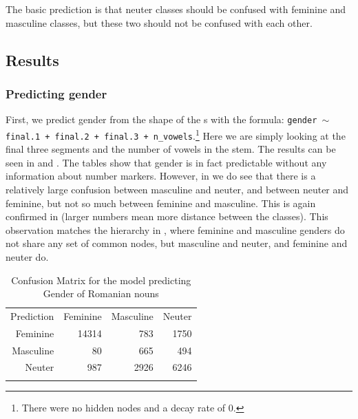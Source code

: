 The basic prediction is that neuter classes should be confused with feminine and masculine classes, but these two should not be confused with each other.

\subsection{Results}

\subsubsection{Predicting gender}

First, we predict gender from the shape of the s with the formula: \texttt{gender $\sim$ final.1 + final.2 + final.3 + n\_vowels}.\footnote{There were no hidden nodes and a decay rate of 0.} Here we are simply looking at the final three segments and the number of vowels in the stem. The results can be seen in  and . The tables show that gender is in fact predictable without any information about number markers. However, in  we do see that there is a relatively large confusion between masculine and neuter, and between neuter and feminine, but not so much between feminine and masculine. This is again confirmed in  (larger numbers mean more distance between the classes). This observation matches the hierarchy in , where feminine and masculine genders do not share any set of common nodes, but masculine and neuter, and feminine and neuter do.

\begin{table}
  \centering
  \begin{tabular}{rrrr}
    \lsptoprule
    \multicolumn{4}{c}{Reference}              \\
    \midrule
    Prediction & Feminine & Masculine & Neuter \\
    Feminine   & 14314    & 783       & 1750   \\
    Masculine  & 80       & 665       & 494    \\
    Neuter     & 987      & 2926      & 6246   \\
    \lspbottomrule
  \end{tabular}
  \caption{Confusion Matrix for the model predicting Gender of Romanian nouns}\label{tab:gender-romanian}
\end{table}

